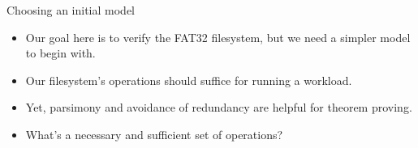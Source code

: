 \documentclass{beamer}
\begin{document}
\begin{frame}{Choosing an initial model}
  \begin{itemize}
    \item Our goal here is to verify the FAT32 filesystem, but we need
      a simpler model to begin with.
    \item Our filesystem's operations should suffice for running a
      workload.
    \item Yet, parsimony and avoidance of redundancy are helpful for
      theorem proving.
    \item What's a necessary and sufficient set of operations?
  \end{itemize}
\end{frame}

\end{document}
